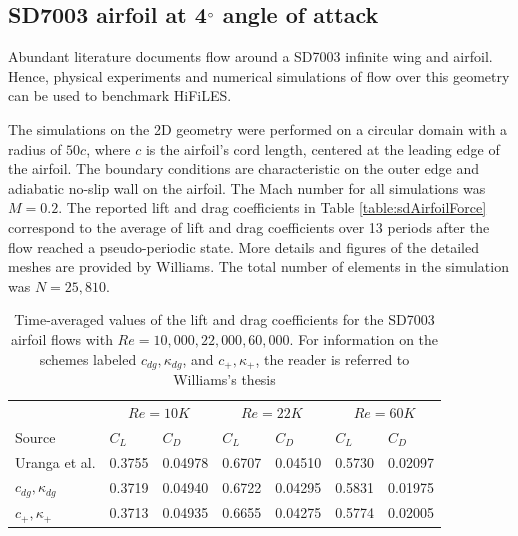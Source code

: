 \graphicspath{{figures_SD7003/}}%

\subsection{SD7003 airfoil at 4$^{\circ}$ angle of attack}\label{sd7003airfoil}

Abundant literature documents flow around a SD7003 infinite wing and airfoil. Hence, physical experiments \cite{ol2005comparison,radespiel2007numerical} and numerical simulations \cite{galbraith2008implicit,visbal2009high,castonguay2010simulation,persson2010high,uranga2011implicit} of flow over this geometry can be used to benchmark HiFiLES.

The simulations on the 2D geometry were performed on a circular domain with a radius of $50c$, where $c$ is the airfoil's cord length, centered at the leading edge of the airfoil. The boundary conditions are characteristic on the outer edge and adiabatic no-slip wall on the airfoil. The Mach number for all simulations was $M = 0.2$. The reported lift and drag coefficients in Table \eqref{table:sdAirfoilForce} correspond to the average of lift and drag coefficients over 13 periods after the flow reached a pseudo-periodic state. More details and figures of the detailed meshes are provided by Williams\cite{williams2013thesis}. The total number of elements in the simulation was $N = 25,810$.

\begin{table}[htbp]
\centering
\begin{tabular}{ l| l l| l l| l l} 
  
 &  \multicolumn{2}{|c|}{$Re = 10K$}  & \multicolumn{2}{|c|}{$Re = 22K$} & \multicolumn{2}{|c}{$Re = 60K$}  \\ 
 Source & $C_L$ & $C_D$ & $C_L$ & $C_D$ & $C_L$ & $C_D$   \\ 
\hline
 Uranga et al.\cite{uranga2011implicit} & 0.3755 & 0.04978 & 0.6707 & 0.04510 & 0.5730 & 0.02097  \\ 
$c_{dg},\kappa_{dg}$ & 0.3719 & 0.04940 & 0.6722 & 0.04295 & 0.5831 & 0.01975 \\ 
$c_{+},\kappa_{+}$ & 0.3713 & 0.04935 & 0.6655 & 0.04275 & 0.5774 & 0.02005  \\ 
 \end{tabular}
\caption{Time-averaged values of the lift and drag coefficients for the SD7003 airfoil flows with $Re = 10,000, 22,000, 60,000$. For information on the schemes labeled $c_{dg},\kappa_{dg}$, and $c_{+},\kappa_{+}$, the reader is referred to Williams's thesis \cite{williams2013thesis}}
\label{table:sdAirfoilForce} 
 \end{table}

